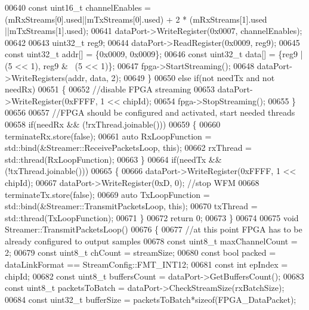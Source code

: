 \begin{DoxyCode}
00640         \textcolor{keyword}{const} uint16\_t channelEnables = (mRxStreams[0].used||mTxStreams[0].used) + 2 * (mRxStreams[1].used
      ||mTxStreams[1].used);
00641         dataPort->WriteRegister(0x0007, channelEnables);
00642 
00643         uint32\_t reg9;
00644         dataPort->ReadRegister(0x0009, reg9);
00645         \textcolor{keyword}{const} uint32\_t addr[] = \{0x0009, 0x0009\};
00646         \textcolor{keyword}{const} uint32\_t data[] = \{reg9 | (5 << 1), reg9 & ~(5 << 1)\};
00647         fpga->StartStreaming();
00648         dataPort->WriteRegisters(addr, data, 2);
00649     \}
00650     \textcolor{keywordflow}{else} \textcolor{keywordflow}{if}(not needTx and not needRx)
00651     \{
00652         \textcolor{comment}{//disable FPGA streaming}
00653         dataPort->WriteRegister(0xFFFF, 1 << chipId);
00654         fpga->StopStreaming();
00655     \}
00656 
00657     \textcolor{comment}{//FPGA should be configured and activated, start needed threads}
00658     \textcolor{keywordflow}{if}(needRx && (!rxThread.joinable()))
00659     \{
00660         terminateRx.store(\textcolor{keyword}{false});
00661         \textcolor{keyword}{auto} RxLoopFunction = std::bind(&Streamer::ReceivePacketsLoop, \textcolor{keyword}{this});
00662         rxThread = std::thread(RxLoopFunction);
00663     \}
00664     \textcolor{keywordflow}{if}(needTx && (!txThread.joinable()))
00665     \{
00666         dataPort->WriteRegister(0xFFFF, 1 << chipId);
00667         dataPort->WriteRegister(0xD, 0); \textcolor{comment}{//stop WFM}
00668         terminateTx.store(\textcolor{keyword}{false});
00669         \textcolor{keyword}{auto} TxLoopFunction = std::bind(&Streamer::TransmitPacketsLoop, \textcolor{keyword}{this});
00670         txThread = std::thread(TxLoopFunction);
00671     \}
00672     \textcolor{keywordflow}{return} 0;
00673 \}
00674 
00675 \textcolor{keywordtype}{void} Streamer::TransmitPacketsLoop()
00676 \{
00677     \textcolor{comment}{//at this point FPGA has to be already configured to output samples}
00678     \textcolor{keyword}{const} uint8\_t maxChannelCount = 2;
00679     \textcolor{keyword}{const} uint8\_t chCount = streamSize;
00680     \textcolor{keyword}{const} \textcolor{keywordtype}{bool} packed = dataLinkFormat == StreamConfig::FMT_INT12;
00681     \textcolor{keyword}{const} \textcolor{keywordtype}{int} epIndex = chipId;
00682     \textcolor{keyword}{const} uint8\_t buffersCount = dataPort->GetBuffersCount();
00683     \textcolor{keyword}{const} uint8\_t packetsToBatch = dataPort->CheckStreamSize(rxBatchSize);
00684     \textcolor{keyword}{const} uint32\_t bufferSize = packetsToBatch*\textcolor{keyword}{sizeof}(FPGA_DataPacket);

\end{DoxyCode}
